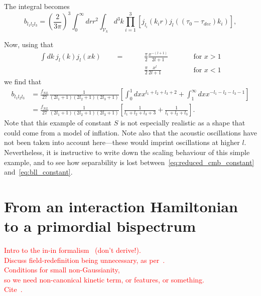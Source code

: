     The integral becomes
    \begin{equation}
    \label{eq:reduced_cmb_constant}
    b_{l_1l_2l_3} = \left(\frac{2}{3\pi}\right)^3\int_{0}^{\infty}drr^2
        \int_{\mathcal{V}_k}d^3k \prod_{i=1}^{3}\left[j_{l_i}(k_ir)j_l((\tau_0-\tau_{dec})k_i)\right],
    \end{equation}


    Now, using that
    \begin{align}
        \int dk~j_l(k)j_l(xk)\qquad=\qquad&\frac{\pi}{2}\frac{x^{-(l+1)}}{2l+1}\qquad&&\text{for $x>1$}\\
                            \qquad&\frac{\pi}{2}\frac{x^{l}}{2l+1}\qquad&&\text{for $x<1$}
    \end{align}
    we find that
    \begin{align}
    \label{eq:bll_constant}
        b_{l_1l_2l_3} &= \frac{f_{NL}}{27}\frac{1}{(2l_1+1)(2l_2+1)(2l_3+1)}
        \left[\int^1_0dx x^{l_1+l_2+l_3+2}+\int^\infty_1dx x^{-l_1-l_2-l_3-1}\right]\\
                &= \frac{f_{NL}}{27}\frac{1}{(2l_1+1)(2l_2+1)(2l_3+1)}
        \left[\frac{1}{l_1+l_2+l_3+3}+\frac{1}{l_1+l_2+l_3}\right].
    \end{align}
    Note that this example of constant $S$ is not especially realistic as a shape that could
    come from a model of inflation. Note also that the acoustic oscillations have not been taken
    into account here---these would imprint oscillations at higher $l$.
    Nevertheless, it is instructive to write down the scaling behaviour of this
    simple example, and to see how separability is lost between~\eqref{eq:reduced_cmb_constant}
    and~\eqref{eq:bll_constant}.


    \section{From an interaction Hamiltonian to a primordial bispectrum}\label{sec:inin_calc_example}
    \textcolor{red}{Intro to the
    in-in formalism~\cite{Baumann_tasi} (don't derive!).\\
    Discuss field-redefinition being unnecessary, as per~\cite{px_burrage}.\\
    Conditions for small non-Gaussianity,\\
    so we need non-canonical kinetic term, or features, or something.\\
    Cite~\cite{Bartolo_review_2004, Chen_review_2010, Babich_2004, Baumann_horizon_2011,
    Renaux-Petel_2015, Meerburg_clock}.}


